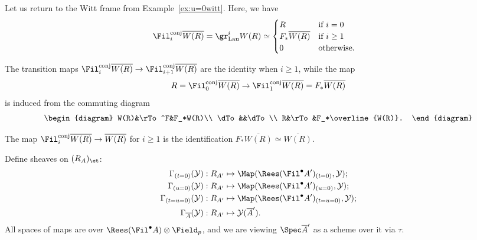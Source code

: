 \documentclass[10pt]{amsart}
\begin{document}
\begin{example}
\label{ex:t=0witt}
Let us return to the Witt frame from Example~\ref{ex:u=0witt}. Here, we have 
\begin{align*}
\Fil^{\mathrm{conj}}_i\overline{W(R)} = \gr^i_{\mathrm{Lau}}W(R)&\simeq \begin{cases}
R&\text{if $i=0$}\\
F_*\overline{W(R)}&\text{if $i\ge 1$}\\
0&\text{otherwise}.
\end{cases}
\end{align*}

The transition maps $\Fil^{\mathrm{conj}}_i\overline{W(R)}\to \Fil^{\mathrm{conj}}_{i+1}\overline{W(R)}$ are the identity when $i\ge 1$, while the map
\[
R = \Fil^{\mathrm{conj}}_0\overline{W(R)} \to \Fil^{\mathrm{conj}}_1\overline{W(R)} = F_*\overline{W(R)}
\]
is induced from the commuting diagram
\[
\begin{diagram}
W(R)&\rTo^F&F_*W(R)\\
\dTo&&\dTo\\
R&\rTo&F_*\overline{W(R)}.
\end{diagram}
\]

The map $\Fil^{\mathrm{conj}}_i\overline{W(R)}\to \overline{W(R)}$ for $i\ge 1$ is the identification $F_*\overline{W(R)}\simeq \overline{W(R)}$.
\end{example}






\begin{definition}
Define sheaves on $(R_A)_{\et}$:
\begin{align*}
\Gamma_{(t=0)}(\mathcal{Y}):R_{A'}&\mapsto \Map(\Rees(\Fil^\bullet A')_{(t=0)},\mathcal{Y});\\
\Gamma_{(u=0)}(\mathcal{Y}):R_{A'}&\mapsto \Map(\Rees(\Fil^\bullet A')_{(u=0)},\mathcal{Y});\\
\Gamma_{(t=u=0)}(\mathcal{Y}):R_{A'}&\mapsto \Map(\Rees(\Fil^\bullet A')_{(t=u=0)},\mathcal{Y});\\
\Gamma_{\overline{A}}(\mathcal{Y}):R_{A'}&\mapsto \mathcal{Y}(\overline{A}').
\end{align*}
All spaces of maps are over $\Rees(\Fil^\bullet A)\otimes\Field_p$, and we are viewing $\Spec \overline{A}'$ as a scheme over it via $\tau$.
\end{definition} 
\end{document}
